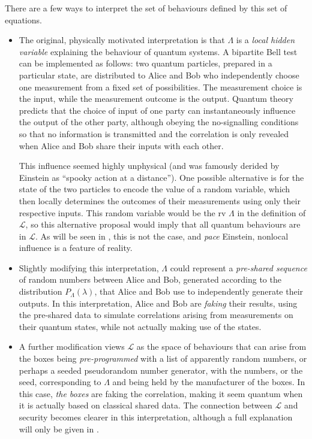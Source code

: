 \documentclass[10pt, a4paper]{article}
\numberwithin{equation}{section} %
\theoremstyle{definition}
\theoremstyle{plain}
\newcommand{\?}{\mathrel{?}} %
\newcommand{\Ls}{\mathcal{L}}
\begin{document}
    There are a few ways to interpret the set of behaviours defined by this set of equations.
    \begin{itemize}
      \item The original, physically motivated interpretation is that \(\Lambda\) is a \emph{local hidden variable} explaining the behaviour of quantum systems. A bipartite Bell test can be implemented as follows: two quantum particles, prepared in a particular state, are distributed to Alice and Bob who independently choose one measurement from a fixed set of possibilities. The measurement choice is the input, while the measurement outcome is the output. Quantum theory predicts that the choice of input of one party can instantaneously influence the output of the other party, although obeying the no-signalling conditions so that no information is transmitted and the correlation is only revealed when Alice and Bob share their inputs with each other.

        This influence seemed highly unphysical (and was famously derided by Einstein as ``spooky action at a distance''). One possible alternative is for the state of the two particles to encode the value of a random variable, which then locally determines the outcomes of their measurements using only their respective inputs. This random variable would be the rv \(\Lambda\) in the definition of \(\Ls\), so this alternative proposal would imply that all quantum behaviours are in \(\Ls\). As will be seen in , this is not the case, and \emph{pace} Einstein, nonlocal influence is a feature of reality.
      \item Slightly modifying this interpretation, \(\Lambda\) could represent a \emph{pre-shared sequence} of random numbers between Alice and Bob, generated according to the distribution \(P_{\Lambda}(\lambda)\), that Alice and Bob use to independently generate their outputs. In this interpretation, Alice and Bob are \emph{faking} their results, using the pre-shared data to simulate correlations arising from measurements on their quantum states, while not actually making use of the states.
      \item A further modification views \(\Ls\) as the space of behaviours that can arise from the boxes being \emph{pre-programmed} with a list of apparently random numbers, or perhaps a seeded pseudorandom number generator, with the numbers, or the seed, corresponding to \(\Lambda\) and being held by the manufacturer of the boxes. In this case, \emph{the boxes} are faking the correlation, making it seem quantum when it is actually based on classical shared data. The connection between \(\Ls\) and security becomes clearer in this interpretation, although a full explanation will only be given in .
    \end{itemize}
\end{document}
